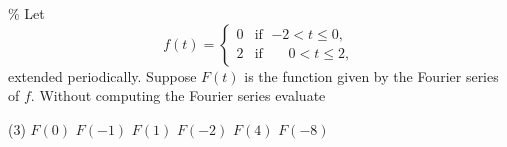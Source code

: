 \documentclass{ximera}
\begin{document}
\begin{exercise}\%
    Let
    \begin{equation*}
        f(t) = 
        \begin{cases}
            0 & \text{if } \; {-2} < t \leq 0, \\
            2 & \text{if } \; \phantom{-}0 < t \leq 2,
        \end{cases}
    \end{equation*}
    extended periodically.  Suppose $F(t)$ is the function given by the Fourier series of $f$.  Without computing the Fourier series evaluate
    \begin{tasks}(3)
        \task $F(0)$
        \task $F(-1)$
        \task $F(1)$
        \task $F(-2)$
        \task $F(4)$
        \task $F(-8)$
    \end{tasks}
\end{exercise}

\end{document}
